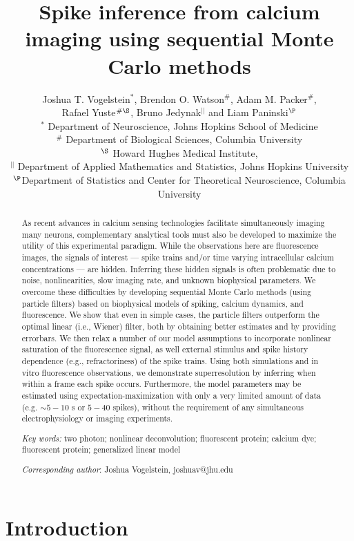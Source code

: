 \documentclass[10pt]{article}
\title{Spike inference from calcium imaging using sequential Monte Carlo methods}%
\author{Joshua T. Vogelstein$^\ast$, Brendon O. Watson$^\#$,  Adam M. Packer$^\#$, \\ Rafael Yuste$^{\#\S}$, Bruno Jedynak$^{||}$ and Liam Paninski$^\P$ \\  $^\ast$ Department of Neuroscience, Johns Hopkins School of Medicine \\ $^\#$ Department of Biological Sciences, Columbia University \\ $^\S$ Howard Hughes Medical Institute, \\
$^{||}$ Department of Applied Mathematics and Statistics, Johns Hopkins University \\
$^\P$Department of Statistics and Center for Theoretical Neuroscience, Columbia University}
\begin{document}
\maketitle
\begin{abstract}

As recent advances in calcium sensing technologies facilitate simultaneously imaging many neurons, complementary analytical tools must also be developed to maximize the utility of this experimental paradigm. While the observations here are fluorescence images, the signals of interest --- spike trains and/or time varying intracellular calcium concentrations --- are hidden.  Inferring these hidden signals is often problematic due to noise, nonlinearities, slow imaging rate, and unknown biophysical parameters. We overcome these difficulties by developing sequential Monte Carlo methods (using particle filters) based on biophysical models of spiking, calcium dynamics, and fluorescence. We show that even in simple cases, the particle filters outperform the optimal linear (i.e., Wiener) filter, both by obtaining better estimates and by providing errorbars. We then relax a number of our model assumptions to incorporate nonlinear saturation of the fluorescence signal, as well external stimulus and spike history dependence (e.g., refractoriness) of the spike trains. Using both simulations and in vitro fluorescence observations, we demonstrate superresolution by inferring when within a frame each spike occurs. Furthermore, the model parameters may be estimated using expectation-maximization with only a very limited amount of data (e.g. $\sim 5-10$ s or $5-40$ spikes), without the requirement of any simultaneous electrophysiology or imaging experiments.

\emph{Key words:} two photon; nonlinear deconvolution; fluorescent protein; calcium dye; fluorescent protein; generalized linear model 

\emph{Corresponding author}: Joshua Vogelstein, joshuav@jhu.edu

\end{abstract}

\newpage
\pagestyle{myheadings}


\section*{Introduction}
\end{document}
